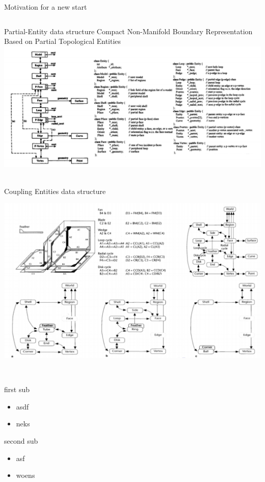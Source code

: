 \begin{frame}{Motivation for a new start}
\begin{columns}[T]
\begin{column}{0.48\textwidth}
\begin{block}{Partial-Entity data structure \cite{SangHunLee2001}}
Compact Non-Manifold Boundary Representation Based on Partial
Topological Entities
\includegraphics{figs/SangHunLee2001_partial_entity.png}~

\end{block}

\begin{block}{Coupling Entities data structure
\cite{yamaguchi1995nonmanifold}}

\includegraphics{figs/yamaguchi1995nonmanifold.png}~

\end{block}
\end{column}
\end{columns}

\begin{block}{first sub}

\begin{itemize}
\tightlist
\item
  asdf
\item
  neks
\end{itemize}

\end{block}

\begin{block}{second sub}

\begin{itemize}
\tightlist
\item
  asf
\item
  woens
\end{itemize}

\end{block}

\end{frame}

